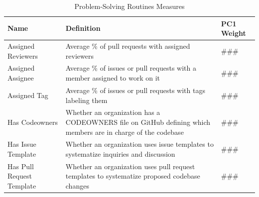 \begin{longtable}{>{\raggedright\arraybackslash}p{} p{}p{}}
\caption{Problem-Solving Routines Measures}\label{tab:problem_solving_routines_metrics}\\
\toprule
\textbf{Name} & \textbf{Definition} & \textbf{PC1 Weight} \\
\midrule
\endfirsthead

\bottomrule
\endlastfoot

Assigned Reviewers & Average \% of pull requests with assigned reviewers & ### \\
Assigned Assignee & Average \% of issues or pull requests with a member assigned to work on it & ### \\
Assigned Tag & Average \% of issues or pull requests with tags labeling them  & ### \\
Has Codeowners & Whether an organization has a CODEOWNERS file on GitHub defining which members are in charge of the codebase & ### \\
Has Issue Template & Whether an organization uses issue templates to systematize inquiries and discussion  & ### \\
Has Pull Request Template & Whether an organization uses pull request templates to systematize proposed codebase changes  & ### \\
\end{longtable}
